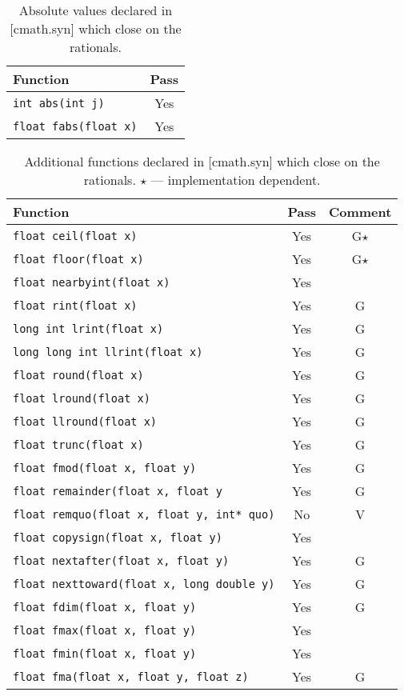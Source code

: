 \documentclass[prd,twocolumn,amsmath,amssymb,nofootinbib,eqsecnum]{revtex4-1}
\newcommand{\code}[1]{{\tt #1}}
\begin{document}
\begin{table}[h]
	\begin{tabular}{lc}
		Function & Pass
	\\
	\hline \hline
		\code{int abs(int j)} & Yes
	\\
	\hline
		\code{float fabs(float x)} & Yes
	\end{tabular}
\caption{Absolute values declared in [cmath.syn]  which close on the rationals.}
\label{tab:26.9.2}
\end{table}

\begin{table}[h]
	\begin{tabular}{lcc}
		Function & Pass & Comment
	\\
	\hline \hline
		\code{float ceil(float x)} &  Yes & G$\star$
	\\
	\hline
		\code{float floor(float x)} & Yes & G$\star$
	\\
	\hline
		\code{float nearbyint(float x)} & Yes &
	\\
	\hline
		\code{float rint(float x)} & Yes & G
	\\
	\hline
		\code{long int lrint(float x)} &  Yes & G
	\\
	\hline
		\code{long long int llrint(float x)} & Yes & G
	\\
	\hline
		\code{float round(float x)} & Yes & G
	\\
	\hline
		\code{float lround(float x)} & Yes & G
	\\
	\hline
		\code{float llround(float x)} & Yes & G
	\\
	\hline
		\code{float trunc(float x)} &  Yes & G
	\\
	\hline
		\code{float fmod(float x, float y)} & Yes & G
	\\
	\hline
		\code{float remainder(float x, float y} & Yes & G
	\\
	\hline
		\code{float remquo(float x, float y, int* quo)} & No & V
	\\
	\hline
		\code{float copysign(float x, float y)} & Yes &
	\\
	\hline
		\code{float nextafter(float x, float y)} & Yes & G
	\\
	\hline
		\code{float nexttoward(float x, long double y)} & Yes & G
	\\
	\hline
		\code{float fdim(float x, float y)} & Yes & G
	\\
	\hline
		\code{float fmax(float x, float y)} & Yes &
	\\
	\hline
		\code{float fmin(float x, float y)} & Yes &
	\\
	\hline
		\code{float fma(float x, float y, float z)} & Yes & G
	\end{tabular}
\caption{Additional functions declared in [cmath.syn]  which close on the rationals. $\star$ --- implementation dependent.}
\label{tab:26.9.3}
\end{table}
\end{document}
